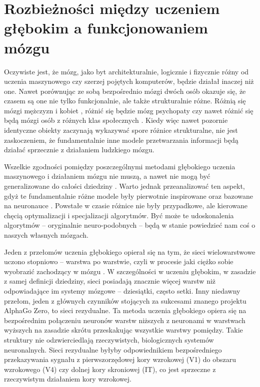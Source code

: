 \section{Rozbieżności między uczeniem głębokim a funkcjonowaniem mózgu}
\label{sec:differences}

Oczywiste jest, że mózg, jako byt architekturalnie, logicznie i fizycznie różny od uczenia maszynowego czy szerzej pojętych komputerów, będzie działał inaczej niż one.
Nawet porównując ze sobą bezpośrednio mózgi dwóch osób okazuje się, że czasem są one nie tylko funkcjonalnie, ale także strukturalnie różne.
Różnią się mózgi mężczyzn i kobiet \cite{ingalhalikar2014sex}, różnić się będzie mózg psychopaty \cite{fallon2017neuroanatomical} czy nawet różnić się będą mózgi osób z różnych klas społecznych \cite{rushton1996brain}.
Kiedy więc nawet pozornie identyczne obiekty zaczynają wykazywać spore różnice strukturalne, nie jest zaskoczeniem, że fundamentalnie inne modele przetwarzania informacji będą działać sprzecznie z działaniem ludzkiego mózgu.

Wszelkie zgodności pomiędzy poszczególnymi metodami głębokiego uczenia maszynowego i działaniem mózgu nie muszą, a nawet nie mogą być generalizowane do całości dziedziny \cite{de2018deep}.
Warto jednak przeanalizować ten aspekt, gdyż te fundamentalnie różne modele były pierwotnie inspirowane oraz bazowane na neuronauce \cite{hassabis2017neuroscience}.
Powstałe w czasie różnice nie były przypadkowe, ale kierowane chęcią optymalizacji i specjalizacji algorytmów.
Być może te udoskonalenia algorytmów -- oryginalnie neuro-podobnych -- będą w stanie powiedzieć nam coś o naszych własnych mózgach.

Jeden z przełomów uczenia głębokiego opierał się na tym, że sieci wielowarstwowe uczono stopniowo -- warstwa po warstwie, czyli w procesie jaki ciężko sobie wyobrazić zachodzący w mózgu \cite{hinton2006fast}.
W szczególności w uczeniu głębokim, w zasadzie z samej definicji dziedziny, sieci posiadają znacznie więcej warstw niż odpowiadające im systemy mózgowe -- dziesiątki, często setki.
Inny niedawny przełom, jeden z głównych czynników stojących za sukcesami znanego projektu AlphaGo Zero, to sieci rezydualne.
Ta metoda uczenia głębokiego opiera się na bezpośrednim połączeniu neuronów warstw niższych z neuronami w warstwach wyższych na zasadzie skrótu przeskakując wszystkie warstwy pomiędzy.
Takie struktury nie odzwierciedlają rzeczywistych, biologicznych systemów neuronalnych.
Sieci rezydualne byłyby odpowiednikiem bezpośredniego przekazywania sygnału z pierwszorzędowej kory wzrokowej (V1) do obszaru wzrokowego (V4) czy dolnej kory skroniowej (IT), co jest sprzeczne z rzeczywistym działaniem kory wzrokowej.

